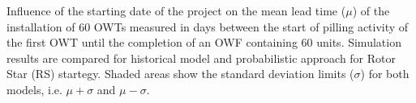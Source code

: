 \label{fig:comparison}
Influence of the starting date of the project on the mean lead time ($\mu$) of the installation of 60 OWTs measured in days between the start of pilling activity of the first OWT until the completion of an OWF containing 60 units. Simulation results are compared for historical model and probabilistic approach for Rotor Star (RS) startegy. Shaded areas show the standard deviation limits ($\sigma$) for both models, i.e. $\mu + \sigma$ and $\mu - \sigma$.